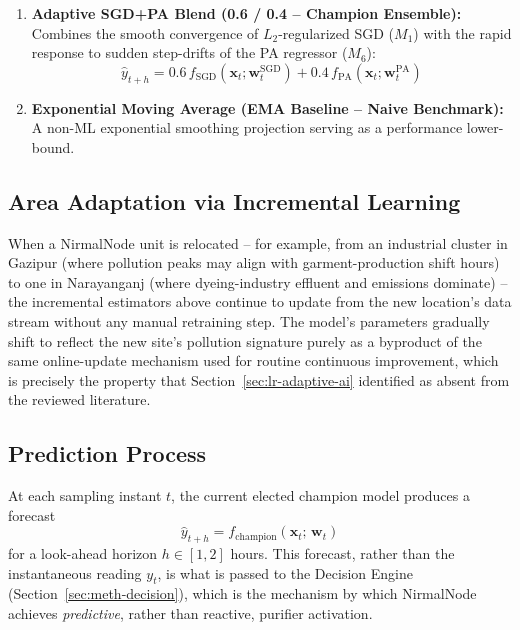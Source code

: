 \begin{enumerate}[label=\textbf{M\arabic*:},leftmargin=*]
    \item \textbf{Adaptive SGD+PA Blend (0.6 / 0.4 -- Champion Ensemble):} Combines the smooth convergence of $L_2$-regularized SGD ($M_1$) with the rapid response to sudden step-drifts of the PA regressor ($M_6$):
    \begin{equation}
    \hat{y}_{t+h} = 0.6\, f_{\text{SGD}}(\mathbf{x}_t; \mathbf{w}_t^{\text{SGD}}) + 0.4\, f_{\text{PA}}(\mathbf{x}_t; \mathbf{w}_t^{\text{PA}})
    \label{eq:blend}
    \end{equation}
    \item \textbf{Exponential Moving Average (EMA Baseline -- Naive Benchmark):} A non-ML exponential smoothing projection serving as a performance lower-bound.
\end{enumerate}

\subsection{Area Adaptation via Incremental Learning}
When a NirmalNode unit is relocated -- for example, from an industrial cluster in Gazipur (where pollution peaks may align with garment-production shift hours) to one in Narayanganj (where dyeing-industry effluent and emissions dominate) -- the incremental estimators above continue to update from the new location's data stream without any manual retraining step. The model's parameters gradually shift to reflect the new site's pollution signature purely as a byproduct of the same online-update mechanism used for routine continuous improvement, which is precisely the property that Section~\ref{sec:lr-adaptive-ai} identified as absent from the reviewed literature.

\subsection{Prediction Process}
At each sampling instant $t$, the current elected champion model produces a forecast
\begin{equation}
\hat{y}_{t+h} = f_{\text{champion}}(\mathbf{x}_t;\, \mathbf{w}_t)
\label{eq:forecast}
\end{equation}
for a look-ahead horizon $h \in [1,2]$ hours. This forecast, rather than the instantaneous reading $y_t$, is what is passed to the Decision Engine (Section~\ref{sec:meth-decision}), which is the mechanism by which NirmalNode achieves \emph{predictive}, rather than reactive, purifier activation.

